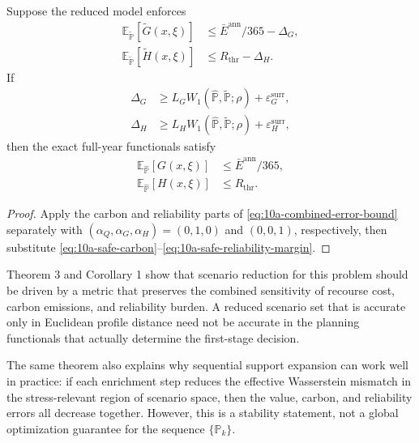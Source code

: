 \begin{corollary}
Suppose the reduced model enforces
\begin{align}
\mathbb{E}_{\widetilde{\mathbb{P}}}[\widetilde G(x,\xi)] &\le \bar E^{\mathrm{ann}}/365 - \Delta_G,
\label{eq:10a-safe-carbon}\\
\mathbb{E}_{\widetilde{\mathbb{P}}}[\widetilde H(x,\xi)] &\le R_{\mathrm{thr}} - \Delta_H.
\label{eq:10a-safe-reliability}
\end{align}
If
\begin{align}
\Delta_G &\ge L_G W_1(\widehat{\mathbb{P}},\widetilde{\mathbb{P}};\rho) + \varepsilon_G^{\mathrm{surr}},
\label{eq:10a-safe-carbon-margin}\\
\Delta_H &\ge L_H W_1(\widehat{\mathbb{P}},\widetilde{\mathbb{P}};\rho) + \varepsilon_H^{\mathrm{surr}},
\label{eq:10a-safe-reliability-margin}
\end{align}
then the exact full-year functionals satisfy
\begin{align}
\mathbb{E}_{\widehat{\mathbb{P}}}[G(x,\xi)] &\le \bar E^{\mathrm{ann}}/365,
\label{eq:10a-exact-carbon-feasible}\\
\mathbb{E}_{\widehat{\mathbb{P}}}[H(x,\xi)] &\le R_{\mathrm{thr}}.
\label{eq:10a-exact-reliability-feasible}
\end{align}
\end{corollary}

\begin{proof}
Apply the carbon and reliability parts of \eqref{eq:10a-combined-error-bound} separately with \((\alpha_Q,\alpha_G,\alpha_H)=(0,1,0)\) and \((0,0,1)\), respectively, then substitute \eqref{eq:10a-safe-carbon}--\eqref{eq:10a-safe-reliability-margin}.
\end{proof}

Theorem 3 and Corollary 1 show that scenario reduction for this problem should be driven by a metric that preserves the combined sensitivity of recourse cost, carbon emissions, and reliability burden. A reduced scenario set that is accurate only in Euclidean profile distance need not be accurate in the planning functionals that actually determine the first-stage decision.

The same theorem also explains why sequential support expansion can work well in practice: if each enrichment step reduces the effective Wasserstein mismatch in the stress-relevant region of scenario space, then the value, carbon, and reliability errors all decrease together. However, this is a stability statement, not a global optimization guarantee for the sequence \(\{\mathbb{P}_k\}\).


